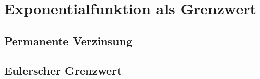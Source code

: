 %
%
%
\section{Exponentialfunktion als Grenzwert
\label{buch:exponential:section:grenzwert}}

\subsection{Permanente Verzinsung}

\subsection{Eulerscher Grenzwert}

